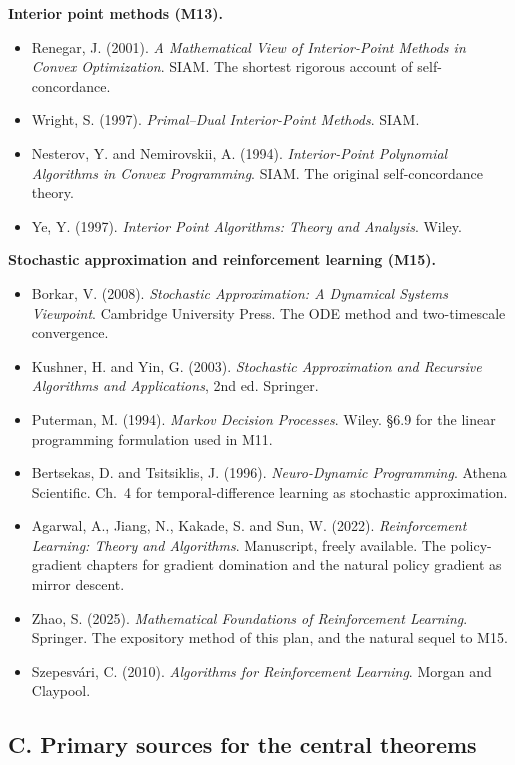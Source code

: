 \documentclass[11pt,a4paper]{article}
\begin{document}
\textbf{Interior point methods (M13).}
\begin{itemize}[label={}]
\item[{[B22]}] Renegar, J. (2001). \emph{A Mathematical View of Interior-Point Methods in
Convex Optimization}. SIAM. The shortest rigorous account of self-concordance.
\item[{[B23]}] Wright, S. (1997). \emph{Primal--Dual Interior-Point Methods}. SIAM.
\item[{[B24]}] Nesterov, Y. and Nemirovskii, A. (1994). \emph{Interior-Point Polynomial
Algorithms in Convex Programming}. SIAM. The original self-concordance theory.
\item[{[B25]}] Ye, Y. (1997). \emph{Interior Point Algorithms: Theory and Analysis}. Wiley.
\end{itemize}

\textbf{Stochastic approximation and reinforcement learning (M15).}
\begin{itemize}[label={}]
\item[{[B26]}] Borkar, V. (2008). \emph{Stochastic Approximation: A Dynamical Systems
Viewpoint}. Cambridge University Press. The ODE method and two-timescale convergence.
\item[{[B27]}] Kushner, H. and Yin, G. (2003). \emph{Stochastic Approximation and Recursive
Algorithms and Applications}, 2nd ed. Springer.
\item[{[B28]}] Puterman, M. (1994). \emph{Markov Decision Processes}. Wiley. \S 6.9 for the
linear programming formulation used in M11.
\item[{[B29]}] Bertsekas, D. and Tsitsiklis, J. (1996). \emph{Neuro-Dynamic Programming}.
Athena Scientific. Ch.~4 for temporal-difference learning as stochastic approximation.
\item[{[B30]}] Agarwal, A., Jiang, N., Kakade, S. and Sun, W. (2022). \emph{Reinforcement
Learning: Theory and Algorithms}. Manuscript, freely available. The policy-gradient chapters
for gradient domination and the natural policy gradient as mirror descent.
\item[{[B31]}] Zhao, S. (2025). \emph{Mathematical Foundations of Reinforcement Learning}.
Springer. The expository method of this plan, and the natural sequel to M15.
\item[{[B32]}] Szepesv\'ari, C. (2010). \emph{Algorithms for Reinforcement Learning}. Morgan
and Claypool.
\end{itemize}

\subsection*{C. Primary sources for the central theorems}
\end{document}
